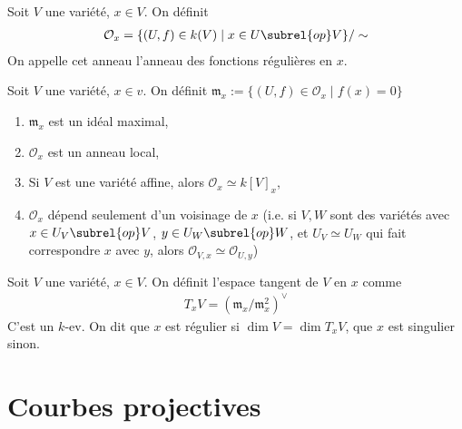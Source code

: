             \begin{defi}
                Soit $V$ une variété, $x \in V$. On définit
                \begin{align*}
                    \mathcal{O}_x = \{(U,f) \in k(V) \mid x \in U \subrel{op} V\}/\sim
                \end{align*}
                On appelle cet anneau l'anneau des fonctions régulières en $x$.
            \end{defi}
            \begin{defi}
                Soit $V$ une variété, $x \in v$. On définit $\mathfrak{m}_x := \{(U,f) \in \mathcal{O}_x \mid f(x) = 0\}$
            \end{defi}
            \begin{exo}
                \begin{enumerate}
                    \item $\mathfrak{m}_x$ est un idéal maximal,
                    \item $\mathcal{O}_x$ est un anneau local,
                    \item Si $V$ est une variété affine, alors $\mathcal{O}_x \simeq k[V]_x$,
                    \item $\mathcal{O}_x$ dépend seulement d'un voisinage de $x$ (i.e. si $V,W$ sont des variétés avec $x \in U_V \subrel{op} V$, $y \in U_W \subrel{op} W$, et $U_V \simeq U_W$ qui fait correspondre $x$ avec $y$, alors $\mathcal{O}_{V,x} \simeq \mathcal{O}_{U,y}$)
                \end{enumerate}
            \end{exo}
            \begin{defi}
                Soit $V$ une variété, $x \in V$. On définit l'espace tangent de $V$ en $x$ comme 
                \begin{align*}
                    T_xV = (\mathfrak{m}_x/\mathfrak{m}_x^2)^\vee
                \end{align*}
                C'est un $k$-ev. On dit que $x$ est régulier si $\dim V = \dim T_xV$, que $x$ est singulier sinon.
            \end{defi}

    \section{Courbes projectives}
